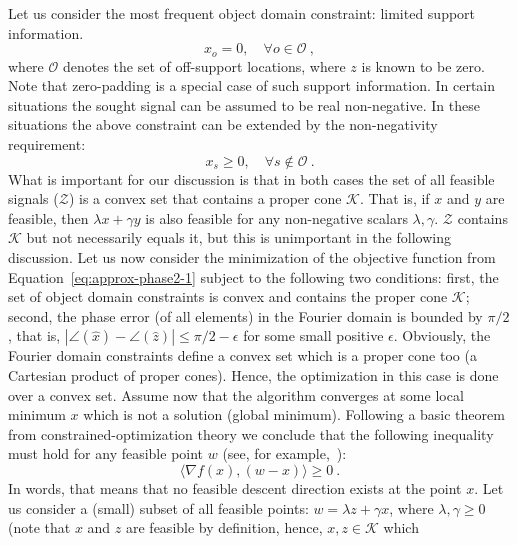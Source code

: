 Let us
consider the most frequent object domain constraint: limited support
information.
\begin{equation}
  \label{eq:phase-approx2-3}
  x_{o} = 0, \quad \forall o\in\mathcal{O}\ ,
\end{equation}
where $\mathcal{O}$ denotes the set of off-support locations, where
$z$ is known to be zero. Note that zero-padding is a special case of
such support information. In certain situations the sought signal can
be assumed to be real non-negative. In these situations the above constraint
can be extended by the non-negativity requirement:
\begin{equation}
  \label{eq:phase-approx2-4}
  x_{s} \geq 0, \quad \forall s\not\in\mathcal{O}\ .
\end{equation}
What is important for our discussion is that in both cases the set of
all feasible signals ($\mathcal{Z}$) is a convex set that contains a
proper cone $\mathcal{K}$. That is, if $x$ and $y$ are feasible, then
$\lambda x + \gamma y$ is also feasible for any non-negative scalars
$\lambda, \gamma$. $\mathcal{Z}$ contains 
$\mathcal{K}$ but not necessarily equals it, but this is
unimportant in the following discussion. Let us now consider the
minimization of the objective function from Equation~\eqref{eq:approx-phase2-1}
subject to the following two conditions: first, the set of object
domain constraints is convex and contains the proper cone
$\mathcal{K}$; second, the phase error (of all elements) in the
Fourier domain is bounded by $\pi/2$, that is, $|\angle(\hat{x}) -
\angle(\hat{z})| \leq \pi/2-\epsilon$ for some small positive
$\epsilon$.  Obviously, the Fourier domain constraints define a convex
set which is a proper cone too (a Cartesian product of proper
cones). Hence, the optimization in this case is done over a convex
set. Assume now that the algorithm converges at some local minimum
$x$ which is not a solution (global minimum). Following a basic
theorem from constrained-optimization 
theory we conclude that the following inequality must hold for any
feasible point $w$ (see, for example,~):
\begin{equation}
  \label{eq:approx-phase2-5}
  \langle \nabla f(x), (w-x)\rangle \geq 0\ .
\end{equation}
In words, that means that no feasible descent direction exists at the
point $x$. Let us consider a (small) subset of all feasible points: $w
= \lambda z + \gamma x$, where $\lambda,\gamma\geq 0$ (note that $x$
and $z$ are feasible by definition, hence, $x,z\in\mathcal{K}$ which
